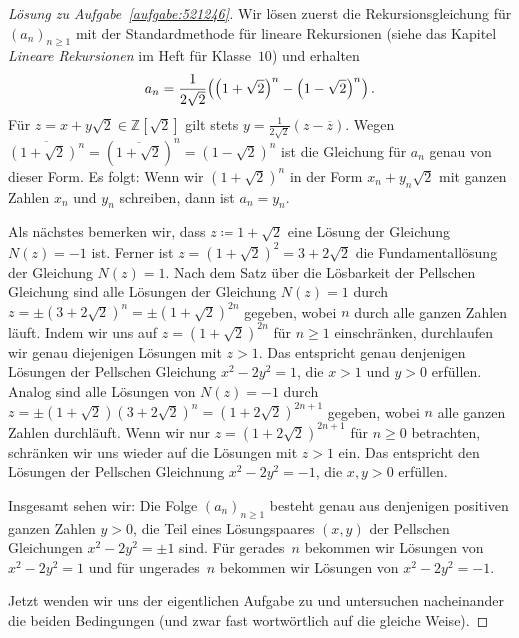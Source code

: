 \begin{proof}[Lösung zu Aufgabe~\ref{aufgabe:521246}]
	Wir lösen zuerst die Rekursionsgleichung für $(a_n)_{n\geqslant 1}$ mit der Standardmethode für lineare Rekursionen (siehe das Kapitel \emph{Lineare Rekursionen} im Heft für Klasse~$10$) und erhalten
	\begin{equation*}
		a_n=\frac{1}{2\sqrt{2}}\parens*{\parens*{1+\sqrt{2}}^n-\parens*{1-\sqrt{2}}^n}\,.
	\end{equation*}
	Für $z=x+y\sqrt{2}\in \mathbb Z[\sqrt{2}]$ gilt stets $y=\frac{1}{2\sqrt{2}}(z-\overline{z})$. Wegen $\overline{(1+\sqrt{2})^n}=(\overline{1+\sqrt{2}})^n=(1-\sqrt{2})^n$ ist die Gleichung für $a_n$ genau von dieser Form. Es folgt: Wenn wir $(1+\sqrt{2})^n$ in der Form $x_n+y_n\sqrt{2}$ mit ganzen Zahlen $x_n$ und $y_n$ schreiben, dann ist $a_n=y_n$.
	
	Als nächstes bemerken wir, dass $z\coloneqq 1+\sqrt{2}$ eine Lösung der Gleichung $N(z)=-1$ ist. Ferner ist $z=(1+\sqrt{2})^2=3+2\sqrt{2}$ die Fundamentallösung der Gleichung $N(z)=1$. Nach dem Satz über die Lösbarkeit der Pellschen Gleichung sind alle Lösungen der Gleichung $N(z)=1$ durch $z=\pm (3+2\sqrt{2})^n=\pm (1+\sqrt{2})^{2n}$ gegeben, wobei $n$ durch alle ganzen Zahlen läuft. Indem wir uns auf $z=(1+\sqrt{2})^{2n}$ für $n\geqslant 1$ einschränken, durchlaufen wir genau diejenigen Lösungen mit $z>1$. Das entspricht genau denjenigen Lösungen der Pellschen Gleichung $x^2-2y^2=1$, die $x>1$ und $y>0$ erfüllen. Analog sind alle Lösungen von $N(z)=-1$ durch $z=\pm (1+\sqrt{2})(3+2\sqrt{2})^n=(1+2\sqrt{2})^{2n+1}$ gegeben, wobei $n$ alle ganzen Zahlen durchläuft. Wenn wir nur $z=(1+2\sqrt{2})^{2n+1}$ für $n\geqslant 0$ betrachten, schränken wir uns wieder auf die Lösungen mit $z>1$ ein. Das entspricht den Lösungen der Pellschen Gleichnung $x^2-2y^2=-1$, die $x,y>0$ erfüllen.
	
	Insgesamt sehen wir: Die Folge $(a_n)_{n\geqslant 1}$ besteht genau aus denjenigen positiven ganzen Zahlen $y>0$, die Teil eines Lösungspaares $(x,y)$ der Pellschen Gleichungen $x^2-2y^2=\pm 1$ sind. Für gerades~$n$ bekommen wir Lösungen von $x^2-2y^2=1$ und für ungerades~$n$ bekommen wir Lösungen von $x^2-2y^2=-1$.
	
	Jetzt wenden wir uns der eigentlichen Aufgabe zu und untersuchen nacheinander die beiden Bedingungen (und zwar fast wortwörtlich auf die gleiche Weise).
	

\end{proof}
